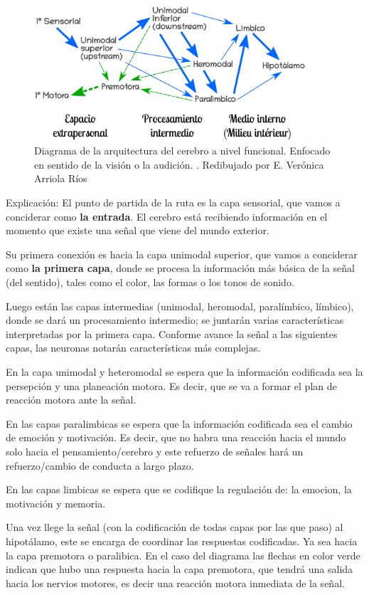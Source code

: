  \begin{figure}[h]
  \centering
  \includegraphics[width=0.9\textwidth]{../Figuras/zonasFuncionales.png}
  \caption{Diagrama de la arquitectura del cerebro a nivel funcional. Enfocado en sentido de la visión o la audición. \parencite{Mesulam1998}. Redibujado por E. Verónica Arriola Ríos}
  \label{fig:zonasFun}
 \end{figure}

Explicación: El punto de partida de la ruta es la capa sensorial, que vamos a conciderar como \textbf{la entrada}. El cerebro está recibiendo información en el momento que existe una señal que viene del mundo exterior.

Su primera conexión es hacia la capa unimodal superior, que vamos a conciderar como \textbf{la primera capa}, donde se procesa la información más básica de la señal (del sentido), tales como el color, las formas o los tonos de sonido.

Luego están las capas intermedias (unimodal, heromodal, paralímbico, límbico), donde se dará un procesamiento intermedio; se juntarán varias características interpretadas por la primera capa. Conforme avance la señal a las siguientes capas, las neuronas notarán características más complejas. 

En la capa unimodal y heteromodal se espera que la información codificada sea la persepción y una planeación motora. Es decir, que se va a formar el plan de reacción motora ante la señal. 

En las capas paralimbicas se espera que la información codificada sea el cambio de emoción y motivación. Es decir, que no habra una reacción hacia el mundo solo hacia el pensamiento/cerebro y este refuerzo de señales hará un refuerzo/cambio de conducta a largo plazo.

En las capas limbicas se espera que se codifique la regulación de: la emocion, la motivación y memoria.

Una vez llege la señal (con la codificación de todas capas por las que paso) al hipotálamo, este se encarga de coordinar las respuestas codificadas. Ya sea hacia la capa premotora o paralibica. En el caso del diagrama las flechas en color verde indican que hubo una respuesta hacia la capa premotora, que tendrá una salida hacia los nervios motores, es decir una reacción motora inmediata de la señal. 


